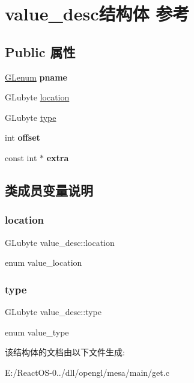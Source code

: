 \hypertarget{structvalue__desc}{}\section{value\+\_\+desc结构体 参考}
\label{structvalue__desc}
\subsection*{Public 属性}
\begin{DoxyCompactItemize}
\item 
\mbox{\label{structvalue__desc_a22b5c8bd80b66aa6a037652cd306340c}} 
\hyperlink{interfacevoid}{G\+Lenum} {\bfseries pname}
\item 
G\+Lubyte \hyperlink{structvalue__desc_a0f660bd4fbbce4a896a01b586d019191}{location}
\item 
G\+Lubyte \hyperlink{structvalue__desc_adc53dfa91821e0f51dda8cafe9468662}{type}
\item 
\mbox{\label{structvalue__desc_ab9e931e800f872d61fb6eeb4053cadb5}} 
int {\bfseries offset}
\item 
\mbox{\label{structvalue__desc_a94a6a3946133ac185b9cd7ec24c2b38a}} 
const int $\ast$ {\bfseries extra}
\end{DoxyCompactItemize}


\subsection{类成员变量说明}
\mbox{\label{structvalue__desc_a0f660bd4fbbce4a896a01b586d019191}} 
\subsubsection{\texorpdfstring{location}{location}}
{\footnotesize\ttfamily G\+Lubyte value\+\_\+desc\+::location}

enum value\+\_\+location \mbox{\label{structvalue__desc_adc53dfa91821e0f51dda8cafe9468662}} 
\subsubsection{\texorpdfstring{type}{type}}
{\footnotesize\ttfamily G\+Lubyte value\+\_\+desc\+::type}

enum value\+\_\+type 

该结构体的文档由以下文件生成\+:\begin{DoxyCompactItemize}
\item 
E\+:/\+React\+O\+S-\/0../dll/opengl/mesa/main/get.\+c\end{DoxyCompactItemize}
